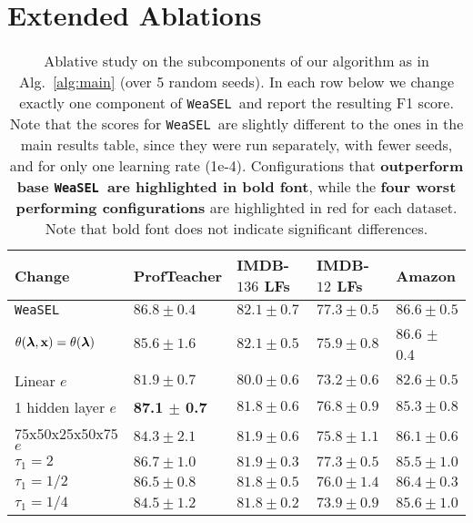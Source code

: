 \documentclass{article}
\newcommand{\weasel}{\texttt{WeaSEL}}\newcommand{\brackets}[1]{\left( #1 \right)}
\newcommand{\features}{\mathbf{x}}
\newcommand{\Abl}[2]{{#1 $\pm$ #2}}
\newcommand{\emphAbl}[2]{{\textbf{#1 $\pm$ #2}}}
\begin{document}
\section{Extended Ablations} \label{sec:ablationsAppendix}
\begin{table}
\centering
\caption{Ablative study on the subcomponents of our algorithm as in Alg.~\ref{alg:main} (over 5 random seeds). In each row below we change exactly one component of \weasel\, and report the resulting F1 score. Note that the scores for \weasel\ are slightly different to the ones in the main results table, since they were run separately, with fewer seeds, and for only one learning rate (1e-4). Configurations that \textbf{outperform base \weasel\ are highlighted in bold font}, while the \color{red}\textbf{four worst performing configurations }\color{black} are highlighted in red for each dataset. Note that bold font does not indicate significant differences.}
\vspace{5pt}
\label{tab:fullAbl}
\begin{tabular}{@{} *5l @{}}
\toprule
    Change  & 
        ProfTeacher & IMDB-$136$ \small{LFs} & IMDB-$12$ \small{LFs} & Amazon \\ 
    \midrule
    \weasel & 
        $86.8 \pm 0.4$ & $82.1 \pm 0.7$ &  $77.3 \pm 0.5$ & $86.6 \pm 0.5$ \\ 
    \midrule
    $\theta(\lfs, \features) = \theta(\lfs)$ & 
        $85.6 \pm 1.6$ & $82.1 \pm 0.5$ & $75.9 \pm 0.8$ & \Abl{86.6}{0.4} \\
    Linear $e$ &
        $81.9 \pm 0.7$ & $80.0 \pm 0.6$ & $73.2 \pm 0.6$ &  $82.6 \pm 0.5$ \\
    1 hidden layer $e$ &
        \emphAbl{87.1}{0.7} & $81.8 \pm 0.6$ & $76.8 \pm 0.9$ & $85.3 \pm 0.8$\\
    75x50x25x50x75 $e$ &
        $84.3 \pm 2.1$ & $81.9 \pm 0.6$ & $75.8 \pm 1.1$ & $86.1 \pm 0.6$ \\
    $\tau_1 = 2$   & 
        $86.7 \pm 1.0$ & $81.9 \pm 0.3$ & $77.3 \pm 0.5$ & $85.5 \pm 1.0$ \\ 
    $\tau_1 = 1/2$   & 
        $86.5 \pm 0.8$ & $81.8 \pm 0.5$ & $76.0 \pm 1.4$ & $86.4 \pm 0.3$ \\ 
    $\tau_1 = 1/4$   & 
        $84.5 \pm 1.2$ & $81.8 \pm 0.2$ & $73.9 \pm 0.9$ &  $85.6 \pm 1.0$ \\
        

\end{tabular}
\end{table}
\end{document}
